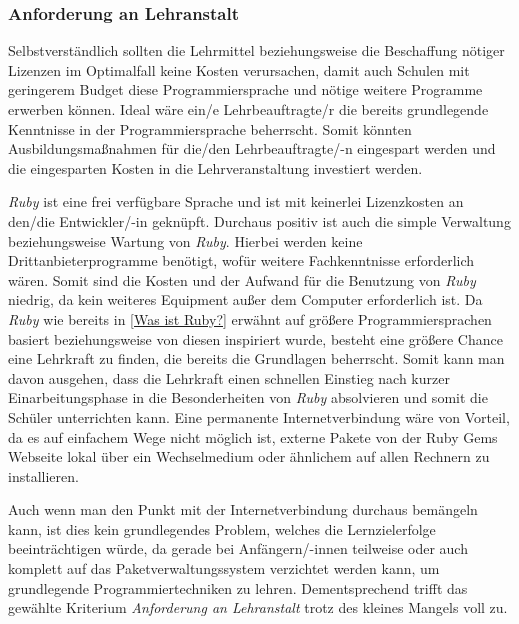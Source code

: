\documentclass[12pt,DIV=14, version=first, BCOR=10mm,a4paper,twoside,parskip=half-,headsepline,headinclude]{scrartcl}
\begin{document}
\subsubsection{Anforderung an Lehranstalt}
\begin{flushleft}
Selbstverständlich sollten die Lehrmittel beziehungsweise die Beschaffung nötiger Lizenzen im Optimalfall keine Kosten verursachen, damit auch Schulen mit geringerem Budget diese Programmiersprache und nötige weitere Programme erwerben können. Ideal wäre ein/e Lehrbeauftragte/r die bereits grundlegende Kenntnisse in der Programmiersprache beherrscht. Somit könnten Ausbildungsmaßnahmen für die/den Lehrbeauftragte/-n eingespart werden und die eingesparten Kosten in die Lehrveranstaltung investiert werden.

\textit{\glqq Ruby\grqq} ist eine frei verfügbare Sprache und ist mit keinerlei Lizenzkosten an den/die Entwickler/-in geknüpft. Durchaus positiv ist auch die simple Verwaltung beziehungsweise Wartung von \textit{\glqq Ruby\grqq}. Hierbei werden keine Drittanbieterprogramme benötigt, wofür weitere Fachkenntnisse erforderlich wären. Somit sind die Kosten und der Aufwand für die Benutzung von \textit{\glqq Ruby\grqq} niedrig, da kein weiteres Equipment außer dem Computer erforderlich ist. Da \textit{\glqq Ruby\grqq} wie bereits in \ref{Was ist Ruby?} erwähnt auf größere Programmiersprachen basiert beziehungsweise von diesen inspiriert wurde, besteht eine größere Chance eine Lehrkraft zu finden, die bereits die Grundlagen beherrscht. Somit kann man davon ausgehen, dass die Lehrkraft einen schnellen Einstieg nach kurzer Einarbeitungsphase in die Besonderheiten von \textit{\glqq Ruby\grqq} absolvieren und somit die Schüler unterrichten kann. Eine permanente Internetverbindung wäre von Vorteil, da es auf einfachem Wege nicht möglich ist, externe Pakete von der Ruby Gems Webseite lokal über ein Wechselmedium oder ähnlichem auf allen Rechnern zu installieren.

Auch wenn man den Punkt mit der Internetverbindung durchaus bemängeln kann, ist dies kein grundlegendes Problem, welches die Lernzielerfolge beeinträchtigen würde, da gerade bei Anfängern/-innen teilweise oder auch komplett auf das Paketverwaltungssystem verzichtet werden kann, um grundlegende Programmiertechniken zu lehren. Dementsprechend trifft das gewählte Kriterium \textit{Anforderung an Lehranstalt} trotz des kleines Mangels voll zu.
\end{flushleft}
\end{document}
